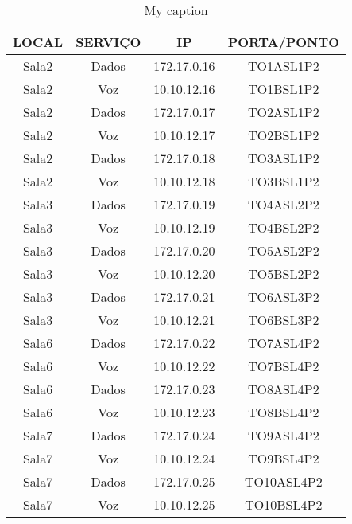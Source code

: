 \begin{table}[]
\centering
\caption{My caption}
\label{my-label}
\begin{tabular}{cccc}
\hline
\textbf{LOCAL} & \textbf{SERVIÇO} & \textbf{IP} & \textbf{PORTA/PONTO} \\ \hline
Sala2          & Dados            & 172.17.0.16 & TO1ASL1P2            \\ \hline
Sala2          & Voz              & 10.10.12.16 & TO1BSL1P2            \\ \hline
Sala2          & Dados            & 172.17.0.17 & TO2ASL1P2            \\ \hline
Sala2          & Voz              & 10.10.12.17 & TO2BSL1P2            \\ \hline
Sala2          & Dados            & 172.17.0.18 & TO3ASL1P2            \\ \hline
Sala2          & Voz              & 10.10.12.18 & TO3BSL1P2            \\ \hline
Sala3          & Dados            & 172.17.0.19 & TO4ASL2P2            \\ \hline
Sala3          & Voz              & 10.10.12.19 & TO4BSL2P2            \\ \hline
Sala3          & Dados            & 172.17.0.20 & TO5ASL2P2            \\ \hline
Sala3          & Voz              & 10.10.12.20 & TO5BSL2P2            \\ \hline
Sala3          & Dados            & 172.17.0.21 & TO6ASL3P2            \\ \hline
Sala3          & Voz              & 10.10.12.21 & TO6BSL3P2            \\ \hline
Sala6          & Dados            & 172.17.0.22 & TO7ASL4P2            \\ \hline
Sala6          & Voz              & 10.10.12.22 & TO7BSL4P2            \\ \hline
Sala6          & Dados            & 172.17.0.23 & TO8ASL4P2            \\ \hline
Sala6          & Voz              & 10.10.12.23 & TO8BSL4P2            \\ \hline
Sala7          & Dados            & 172.17.0.24 & TO9ASL4P2            \\ \hline
Sala7          & Voz              & 10.10.12.24 & TO9BSL4P2            \\ \hline
Sala7          & Dados            & 172.17.0.25 & TO10ASL4P2           \\ \hline
Sala7          & Voz              & 10.10.12.25 & TO10BSL4P2           \\ \hline
\end{tabular}
\end{table}